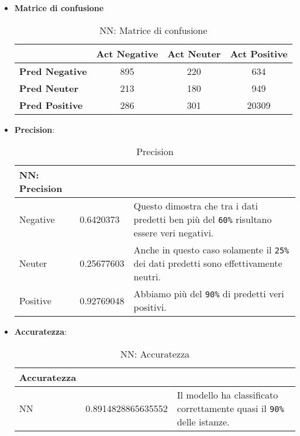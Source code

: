 			\begin{itemize}
				\item \textbf{Matrice di confusione}
				
				\begin{table} [H]
					\caption{NN: Matrice di confusione}
					\label{tab:matriceConfusioneNN}
					\centering
					\begin{tabular}{lccc}
						\toprule 
						& \textbf{Act Negative} & \textbf{Act Neuter}	& \textbf{Act Positive}\\
						\midrule
						\textbf{Pred Negative}  & 895 & 220 & 634\\
						\textbf{Pred Neuter} & 213 & 180 & 949\\
						\textbf{Pred Positive} & 286 & 301 & 20309\\
						\bottomrule
					\end{tabular}
				\end{table}
				
				\item \textbf{Precision}:				
				\begin{table} [H]
					\caption{Precision}
					\label{tab:precisionNN}
					\centering
					\begin{tabular}{llp{}}
						\toprule 
						\textbf{NN: Precision}	\\
						\midrule
						Negative  & 0.6420373  & Questo dimostra che tra i dati predetti ben più del \verb|60%| risultano essere veri negativi.\\
						Neuter & 0.25677603 & Anche in questo caso solamente il \verb|25%| dei dati predetti sono effettivamente neutri.\\
						Positive & 0.92769048 & Abbiamo più del \verb|90%| di predetti veri positivi.\\
						\bottomrule
					\end{tabular}
				\end{table}
				
				\item \textbf{Accuratezza}: 
				
				\begin{table} [H]
					\caption{NN: Accuratezza}
					\label{tab:accNN}
					\centering
					\begin{tabular}{llp{}}
						\toprule 
						\textbf{Accuratezza}	\\
						\midrule
						NN  & 0.8914828865635552 & Il modello ha classificato correttamente quasi il \verb|90%| delle istanze.\\
						\bottomrule
					\end{tabular}
				\end{table}
				

\end{itemize}
